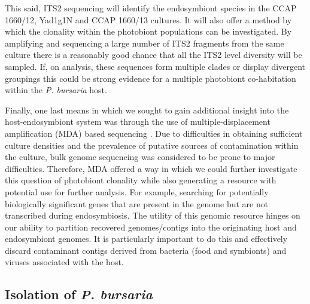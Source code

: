 This said, ITS2 sequencing will identify the endosymbiont species in
the CCAP 1660/12, Yad1g1N and CCAP 1660/13 cultures. It will also offer a
method by which the clonality within the
photobiont populations can be investigated.  
By amplifying and sequencing a large number of 
ITS2 fragments from the same culture there is a reasonably
good chance that all the ITS2 level diversity will be sampled. 
If, on analysis, these sequences form multiple clades or 
display divergent groupings this could be strong evidence
for a multiple photobiont co-habitation within the \textit{P. bursaria}
host.  


Finally, one last means in which we sought to
gain additional insight into the host-endosymbiont
system was through the use of multiple-displacement amplification (MDA)
based sequencing \citep{Lasken2007}.  
Due to difficulties in obtaining sufficient
culture densities and the prevalence of putative sources of contamination
within the culture, bulk genome sequencing was considered to be prone to 
major difficulties.  Therefore, MDA offered a way in which 
we could further investigate this question of photobiont clonality
while also generating a resource with potential use for further analysis.
For example, searching for potentially biologically significant genes
that are 
present in the genome but are not transcribed during endosymbiosis.
The utility of this genomic resource hinges on our ability to 
partition recovered genomes/contigs into the originating host
and endosymbiont genomes.  It is particularly important to do this
and effectively discard contaminant contigs derived from 
bacteria (food and symbionts) and viruses associated with the host. 



%

\subsection{Isolation of \textit{P. bursaria}}

